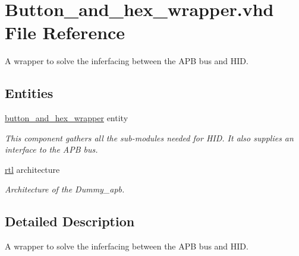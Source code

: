 \hypertarget{Button__and__hex__wrapper_8vhd}{\section{Button\-\_\-and\-\_\-hex\-\_\-wrapper.\-vhd File Reference}
\label{Button__and__hex__wrapper_8vhd}
}


A wrapper to solve the inferfacing between the A\-P\-B bus and H\-I\-D.  


\subsection*{Entities}
\begin{DoxyCompactItemize}
\item 
\hyperlink{classbutton__and__hex__wrapper}{button\-\_\-and\-\_\-hex\-\_\-wrapper} entity
\begin{DoxyCompactList}\small\item\em This component gathers all the sub-\/modules needed for H\-I\-D. It also supplies an interface to the A\-P\-B bus. \end{DoxyCompactList}\item 
\hyperlink{classbutton__and__hex__wrapper_1_1rtl}{rtl} architecture
\begin{DoxyCompactList}\small\item\em Architecture of the Dummy\-\_\-apb. \end{DoxyCompactList}\end{DoxyCompactItemize}


\subsection{Detailed Description}
A wrapper to solve the inferfacing between the A\-P\-B bus and H\-I\-D. 